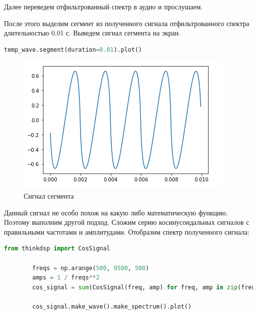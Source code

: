 \documentclass[a4paper, 14pt]{extarticle}
\begin{document}
    Далее переведем отфильтрованный спектр в аудио и прослушаем.

    После этого выделим сегмент из полученного сигнала отфильтрованного спектра длительностью 0.01 с.
    Выведем сигнал сегмента на экран.

    \begin{lstlisting}[language=Python, caption= Фильтрация и вывод спектра, label={lst:sawtooth_filtered_segment_plot}]
        temp_wave.segment(duration=0.01).plot()
    \end{lstlisting}

    \begin{figure}[H]
        \centering
        \includegraphics[width=\textwidth]{sawtooth_filtered_segment}
        \caption{Сигнал сегмента}
        \label{fig:sawtooth_filtered_segment}
    \end{figure}

    Данный сигнал не особо похож на какую либо математическую функцию.
    Поэтому выполним другой подход.
    Сложим серию косинусоидальных сигналов с правильными частотами и амплитудами.
    Отобразим спектр полученного сигнала:

    \begin{lstlisting}[language=Python, caption= Получение сигнала, label={lst:sum_cos}]
        from thinkdsp import CosSignal

        freqs = np.arange(500, 9500, 500)
        amps = 1 / freqs**2
        cos_signal = sum(CosSignal(freq, amp) for freq, amp in zip(freqs, amps))

        cos_signal.make_wave().make_spectrum().plot()
    \end{lstlisting}
\end{document}
